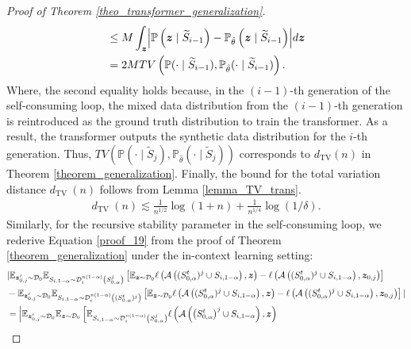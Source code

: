 \begin{proof}[Proof of Theorem \ref{theo_transformer_generalization}]
\begin{align}
&\leq M\int_{\boldsymbol{z}}\Bigl|\mathbb{P}\left(\boldsymbol{z} \mid \widetilde{S}_{i-1}\right)-\mathbb{P}_{\hat{\theta}}\left(\boldsymbol{z} \mid \widetilde{S}_{i-1}\right)\Bigr| d\boldsymbol{z} \notag\\
&= 2M TV\left(\mathbb{P}(\cdot \mid \widetilde{S}_{i-1}), \mathbb{P}_{\hat{\theta}}(\cdot \mid \widetilde{S}_{i-1})\right). \label{proof3-1}
\end{align}
Where, the second equality holds because, in the $(i-1)$-th generation of the self-consuming loop, the mixed data distribution from the $(i-1)$-th generation is reintroduced as the ground truth distribution to train the transformer. As a result, the transformer outputs the synthetic data distribution for the $i$-th generation. Thus,  $T V\left(\mathbb{P}(\cdot \mid \widetilde{S}_{j}), \mathbb{P}_{\hat{\theta}}(\cdot \mid \widetilde{S}_{j})\right)$ corresponds to $d_{\mathrm{TV}}(n)$ in Theorem \ref{theorem_generalization}. Finally, the bound for the total variation distance $d_{\text {TV }}(n)$ follows from Lemma \ref{lemma_TV_trans}.
\begin{align}
    d_{\text {TV }}(n) \lesssim \frac{1}{n^{1 / 2}} \log (1+n)+\frac{1}{n^{1 / 4}} \log (1 / \delta).
\end{align}
Similarly, for the recursive stability parameter in the self-consuming loop, we rederive Equation \ref{proof_19} from the proof of Theorem \ref{theorem_generalization} under the in-context learning setting:
\begin{align}
&|\mathbb{E}_{\boldsymbol{z}_{0,j}^{\prime} \sim \mathcal{D}_0} \mathbb{E}_{S_{i,1-\alpha} \sim \mathcal{D}_i^{n(1-\alpha)}\left(S_{0,\alpha}^j\right)} \left[\mathbb{E}_{\boldsymbol{z} \sim \mathcal{D}_0} \ell\left(\mathcal{A}\left((S_{0,\alpha}^t)^j \cup S_{i,1-\alpha}\right), \boldsymbol{z}\right)-\ell\left(\mathcal{A}\left((S_{0,\alpha}^t)^j \cup S_{i,1-\alpha}\right), \boldsymbol{z}_{0,j}\right)\right] \notag\\
&-\mathbb{E}_{\boldsymbol{z}_{0,j}^{\prime} \sim \mathcal{D}_0} \mathbb{E}_{S_{i,1-\alpha} \sim \mathcal{D}_i^{n(1-\alpha)}\left((S_{0,\alpha}^t)^j\right)}\left[\mathbb{E}_{\boldsymbol{z} \sim \mathcal{D}_0} \ell\left(\mathcal{A}\left((S_{0,\alpha}^t)^j \cup S_{i,1-\alpha}\right), \boldsymbol{z}\right)-\ell\left(\mathcal{A}\left((S_{0,\alpha}^t)^j \cup S_{i,1-\alpha}\right), \boldsymbol{z}_{0,j}\right)\right]| \notag \\
&=\left|\mathbb{E}_{\boldsymbol{z}_{0,j}^{\prime} \sim \mathcal{D}_0} \mathbb{E}_{\boldsymbol{z} \sim \mathcal{D}_0}\left[\mathbb{E}_{S_{i,1-\alpha} \sim \mathcal{D}_i^{n(1-\alpha)}\left(S_{0,\alpha}^j\right)} \ell\left(\mathcal{A}\left(\left(S_{0, \alpha}^t\right)^j \cup S_{i, 1-\alpha}\right), \boldsymbol{z}\right)\right. \right.\notag \\

\end{align}
\end{proof}

